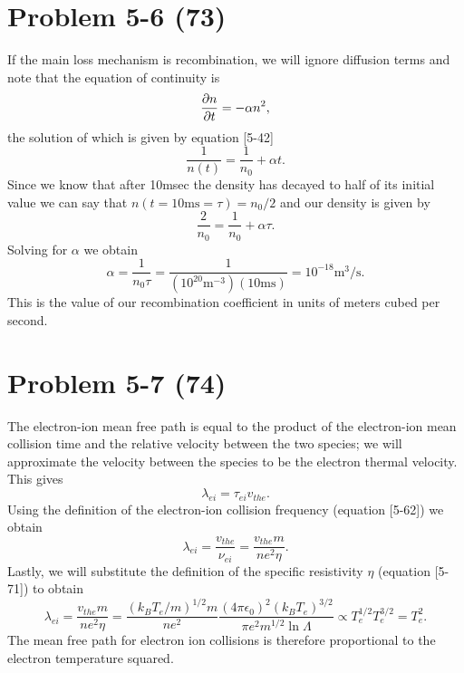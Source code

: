 \section*{Problem 5-6 (73)}
\label{sec:5-6}
If the main loss mechanism is recombination, we will ignore diffusion terms and note that the equation of continuity is
\begin{equation*}
	\frac{\partial n}{\partial t} = -\alpha n^2,
\end{equation*}
the solution of which is given by equation [5-42]
\begin{equation*}
	\dfrac{1}{n(t)} = \dfrac{1}{n_0} + \alpha t.
\end{equation*}
Since we know that after 10msec the density has decayed to half of its initial value we can say that \(n(t = 10\text{ms} = \tau) = n_0/2 \) and our density is given by
\begin{equation*}
	\dfrac{2}{n_0} = \dfrac{1}{n_0} + \alpha \tau.
\end{equation*}
Solving for \(\alpha\) we obtain
\begin{equation*}
	\alpha = \dfrac{1}{n_0 \tau} = \dfrac{1}{(10^{20}\text{m}^{-3})(10\text{ms})} = 10^{-18}\text{m}^3/\text{s}.
\end{equation*}
This is the value of our recombination coefficient in units of meters cubed per second. 

\section*{Problem 5-7 (74)}
\label{sec:5-7}
The electron-ion mean free path is equal to the product of the electron-ion mean collision time and the relative velocity between the two species; we will approximate the velocity between the species to be the electron thermal velocity. This gives
\begin{equation*}
	\lambda_{ei} = \tau_{ei}v_{the}.
\end{equation*}
Using the definition of the electron-ion collision frequency (equation [5-62]) we obtain
\begin{equation*}
	\lambda_{ei} = \dfrac{v_{the}}{\nu_{ei}} = \dfrac{v_{the}m}{ne^2\eta}.
\end{equation*}
Lastly, we will substitute the definition of the specific resistivity \(\eta \) (equation [5-71]) to obtain
\begin{equation*}
	\lambda_{ei} = \dfrac{v_{the}m}{ne^2\eta} = \dfrac{(k_BT_e/m)^{1/2}m}{ne^2}\dfrac{(4\pi\epsilon_0)^2(k_BT_e)^{3/2}}{\pi e^2 m^{1/2}\ln \Lambda} \propto T_e^{1/2}T_e^{3/2} = T_e^2.
\end{equation*}
The mean free path for electron ion collisions is therefore proportional to the electron temperature squared.

